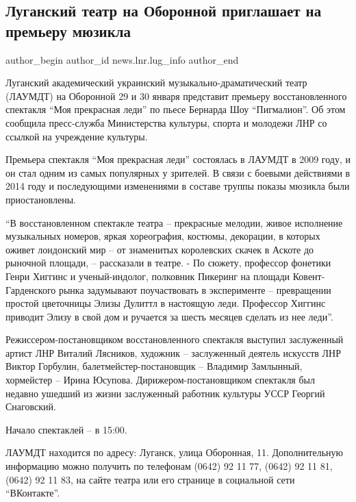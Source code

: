  
 
 
 
 
 
\subsection{Луганский театр на Оборонной приглашает на премьеру мюзикла}
\label{sec:27_01_2022.stz.news.lnr.lug_info.1.lardt_premjera_mjuzikl}
 
\ifcmt
 author_begin
   author_id news.lnr.lug_info
 author_end
\fi

Луганский академический украинский музыкально-драматический театр (ЛАУМДТ) на
Оборонной 29 и 30 января представит премьеру восстановленного спектакля \enquote{Моя
прекрасная леди} по пьесе Бернарда Шоу \enquote{Пигмалион}. Об этом сообщила
пресс-служба Министерства культуры, спорта и молодежи ЛНР со ссылкой на
учреждение культуры.


Премьера спектакля \enquote{Моя прекрасная леди} состоялась в ЛАУМДТ в 2009 году, и он
стал одним из самых популярных у зрителей. В связи с боевыми действиями в 2014
году и последующими изменениями в составе труппы показы мюзикла были
приостановлены.

\enquote{В восстановленном спектакле театра – прекрасные мелодии, живое исполнение
музыкальных номеров, яркая хореография, костюмы, декорации, в которых оживет
лондонский мир – от знаменитых королевских скачек в Аскоте до рыночной площади,
– рассказали в театре. - По сюжету, профессор фонетики Генри Хиггинс и
ученый-индолог, полковник Пикеринг на площади Ковент-Гарденского рынка
задумывают поучаствовать в эксперименте – превращении простой цветочницы Элизы
Дулиттл в настоящую леди. Профессор Хиггинс приводит Элизу в свой дом и
ручается за шесть месяцев сделать из нее леди}.

Режиссером-постановщиком восстановленного спектакля выступил заслуженный артист
ЛНР Виталий Лясников, художник – заслуженный деятель искусств ЛНР Виктор
Горбулин, балетмейстер-постановщик – Владимир Замлынный, хормейстер – Ирина
Юсупова. Дирижером-постановщиком спектакля был недавно ушедший из жизни
заслуженный работник культуры УССР Георгий Снаговский.

Начало спектаклей – в 15:00.

ЛАУМДТ находится по адресу: Луганск, улица Оборонная, 11. Дополнительную
информацию можно получить по телефонам (0642) 92 11 77, (0642) 92 11 81, (0642)
92 11 83, на сайте театра или его странице в социальной сети \enquote{ВКонтакте}.
